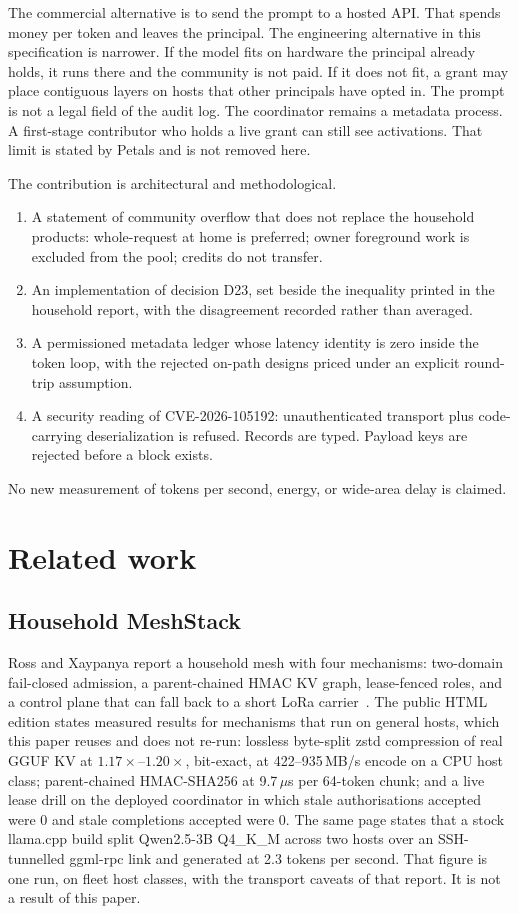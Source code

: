 \documentclass[11pt]{article}
\begin{document}
The commercial alternative is to send the prompt to a hosted API. That spends money per token and leaves the principal. The engineering alternative in this specification is narrower. If the model fits on hardware the principal already holds, it runs there and the community is not paid. If it does not fit, a grant may place contiguous layers on hosts that other principals have opted in. The prompt is not a legal field of the audit log. The coordinator remains a metadata process. A first-stage contributor who holds a live grant can still see activations. That limit is stated by Petals and is not removed here.

The contribution is architectural and methodological.
\begin{enumerate}
\item A statement of community overflow that does not replace the household products: whole-request at home is preferred; owner foreground work is excluded from the pool; credits do not transfer.
\item An implementation of decision D23, set beside the inequality printed in the household report, with the disagreement recorded rather than averaged.
\item A permissioned metadata ledger whose latency identity is zero inside the token loop, with the rejected on-path designs priced under an explicit round-trip assumption.
\item A security reading of CVE-2026-105192: unauthenticated transport plus code-carrying deserialization is refused. Records are typed. Payload keys are rejected before a block exists.
\end{enumerate}
No new measurement of tokens per second, energy, or wide-area delay is claimed.

\section{Related work}
\subsection{Household MeshStack}
Ross and Xaypanya report a household mesh with four mechanisms: two-domain fail-closed admission, a parent-chained HMAC KV graph, lease-fenced roles, and a control plane that can fall back to a short LoRa carrier~\cite{mesh}. The public HTML edition states measured results for mechanisms that run on general hosts, which this paper reuses and does not re-run: lossless byte-split zstd compression of real GGUF KV at \(1.17\times\)--\(1.20\times\), bit-exact, at 422--935\,MB/s encode on a CPU host class; parent-chained HMAC-SHA256 at 9.7\,\(\mu\)s per 64-token chunk; and a live lease drill on the deployed coordinator in which stale authorisations accepted were 0 and stale completions accepted were 0. The same page states that a stock llama.cpp build split Qwen2.5-3B Q4\_K\_M across two hosts over an SSH-tunnelled ggml-rpc link and generated at 2.3 tokens per second. That figure is one run, on fleet host classes, with the transport caveats of that report. It is not a result of this paper.
\end{document}
